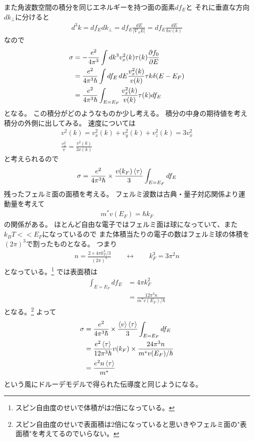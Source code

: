 \documentclass[11pt,dvipdfmx,a4paper]{jsarticle}
\begin{document}
また角波数空間の積分を同じエネルギーを持つ面の面素\(df_E\)と
それに垂直な方向\(dk_{\perp}\)に分けると
\begin{align}
    d^3k =df_Edk_\perp = df_E \frac{dE}{|\nabla_k E|} = df_E \frac{dE}{\hbar v(k)} %
\end{align}
なので
\begin{align}
    \sigma &= -\frac{e^2}{4\pi^3}\int dk^3 v_x^2(k)\tau(k)\pdv{f_0}{E} \\%
    &=\frac{e^2}{4\pi^3\hbar}\int df_E \, dE \frac{v_x^2(k)}{v(k)}\tau{k}\delta(E-E_F) \\%
    &=\frac{e^2}{4\pi^3\hbar}\int_{E=E_F}\frac{v_x^2(k)}{v(k)}\tau(k) df_E \\%
\end{align}
となる。
この積分がどのようなものか少し考える。
積分の中身の期待値を考え積分の外側に出してみる。
速度については
\begin{align}
    v^2(k) = v_x^2(k) + v_y^2(k) + v_z^2(k) = 3 v_x^2\\
    \frac{v_x^2}{v} = \frac{v^2(k)}{3v(k)}
\end{align}
と考えられるので
\begin{align}
    \sigma = \frac{e^2}{4\pi^3\hbar}\times \frac{v(k_F)\ev{\tau}}{3}\int_{E=E_F} df_E
\end{align}
残ったフェルミ面の面積を考える。
フェルミ波数は古典・量子対応関係より運動量を考えて
\begin{align}
    m^*v(E_F) = \hbar k_F %
\end{align}
の関係がある。
ほとんど自由な電子ではフェルミ面は球になっていて、また\(k_BT <<E_F\)になっているので
また体積当たりの電子の数はフェルミ球の体積を\((2\pi)^3\)で割ったものとなる。
つまり
\begin{align}
    n = \frac{2 \times 4 \pi k_F^3/3}{(2\pi)^3} \qquad \leftrightarrow \qquad
    k_F^3 = 3\pi^2n %
\end{align}
となっている。\footnote{スピン自由度のせいで体積がは2倍になっている。}
では表面積は
\begin{align}
    \int_{E=E_F} df_E &= 4\pi k_F^2\\ %
    &=\frac{12\pi^3n}{m^*v(E_F)/\hbar}
\end{align}
となる。\footnote{スピン自由度のせいで表面積は2倍になっていると思いきやフェルミ面の"表面積"を考えてるのでいらない。}
よって
\begin{align}
    \sigma &= \frac{e^2}{4\pi^3\hbar}\times \frac{\ev{v}\ev{\tau}}{3}\int_{E=E_F} df_E\\
    &=\frac{e^2\ev{\tau}}{12\pi^3\hbar} v(k_F) \times\frac{24\pi^3n}{m^*v(E_F)/\hbar}\\
    &=\frac{e^2n\ev{\tau}}{m^*}
\end{align}
という風にドルーデモデルで得られた伝導度と同じようになる。
\end{document}
